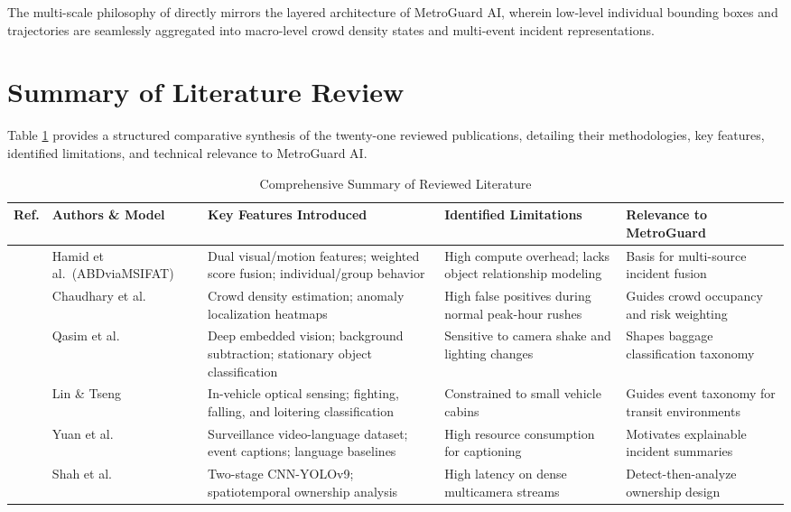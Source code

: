 \documentclass[12pt,a4paper]{report}
\begin{document}
The multi-scale philosophy of \cite{p17} directly mirrors the layered architecture of MetroGuard AI, wherein low-level individual bounding boxes and trajectories are seamlessly aggregated into macro-level crowd density states and multi-event incident representations.

\section{Summary of Literature Review}
Table \ref{tab:lit_review} provides a structured comparative synthesis of the twenty-one reviewed publications, detailing their methodologies, key features, identified limitations, and technical relevance to MetroGuard AI.

\begin{table}[H]
\centering
\scriptsize
\caption{Comprehensive Summary of Reviewed Literature}
\label{tab:lit_review}
\vspace*{5pt}
\begin{tabular}{|c|p{3.2cm}|p{3.8cm}|p{3.8cm}|p{3.2cm}|}
\hline
\textbf{Ref.} & \textbf{Authors \& Model} & \textbf{Key Features Introduced} & \textbf{Identified Limitations} & \textbf{Relevance to MetroGuard} \\ \hline
\cite{p1} & Hamid et al.\ (ABDviaMSIFAT) & Dual visual/motion features; weighted score fusion; individual/group behavior & High compute overhead; lacks object relationship modeling & Basis for multi-source incident fusion \\ \hline
\cite{p2} & Chaudhary et al. & Crowd density estimation; anomaly localization heatmaps & High false positives during normal peak-hour rushes & Guides crowd occupancy and risk weighting \\ \hline
\cite{p3} & Qasim et al. & Deep embedded vision; background subtraction; stationary object classification & Sensitive to camera shake and lighting changes & Shapes baggage classification taxonomy \\ \hline
\cite{p4} & Lin \& Tseng & In-vehicle optical sensing; fighting, falling, and loitering classification & Constrained to small vehicle cabins & Guides event taxonomy for transit environments \\ \hline
\cite{p5} & Yuan et al. & Surveillance video-language dataset; event captions; language baselines & High resource consumption for captioning & Motivates explainable incident summaries \\ \hline
\cite{p6} & Shah et al. & Two-stage CNN-YOLOv9; spatiotemporal ownership analysis & High latency on dense multicamera streams & Detect-then-analyze ownership design \\ \hline

\end{tabular}
\end{table}
\end{document}
